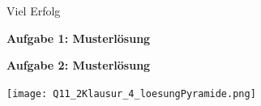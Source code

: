 \documentclass[a4paper,12pt]{article}
\newcommand{\Aufgabe}[1]{
  {
  \vspace*{0.5cm}
  \textsf{\textbf{Aufgabe #1}}
  \vspace*{0.2cm}
  
  }
}
\begin{document}
\vspace{0.5cm}


\centerline{Viel Erfolg}





\newpage
\Aufgabe{1: Musterlösung}

\Aufgabe{2: Musterlösung}
\texttt{[image: Q11\_2Klausur\_4\_loesungPyramide.png]}


\end{document}
